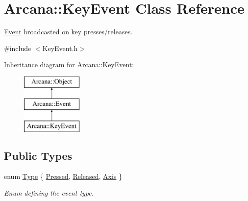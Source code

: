\hypertarget{class_arcana_1_1_key_event}{}\section{Arcana\+:\+:Key\+Event Class Reference}
\label{class_arcana_1_1_key_event}


\mbox{\hyperlink{class_arcana_1_1_event}{Event}} broadcasted on key presses/releases.  




{\ttfamily \#include $<$Key\+Event.\+h$>$}

Inheritance diagram for Arcana\+:\+:Key\+Event\+:\begin{figure}[H]
\begin{center}
\leavevmode
\includegraphics[height=3.000000cm]{class_arcana_1_1_key_event}
\end{center}
\end{figure}
\subsection*{Public Types}
\begin{DoxyCompactItemize}
\item 
enum \mbox{\hyperlink{class_arcana_1_1_key_event_a7e61abd92e372f41647951e8216a93e2}{Type}} \{ \mbox{\hyperlink{class_arcana_1_1_key_event_a7e61abd92e372f41647951e8216a93e2a2b1a00bb9a7e9413f0e672e8c9506153}{Pressed}}, 
\mbox{\hyperlink{class_arcana_1_1_key_event_a7e61abd92e372f41647951e8216a93e2a72cfc2d92b205338e06f3a8493960271}{Released}}, 
\mbox{\hyperlink{class_arcana_1_1_key_event_a7e61abd92e372f41647951e8216a93e2a3285127af15ec2c9ad551b174cd93d77}{Axis}}
 \}
\begin{DoxyCompactList}\small\item\em Enum defining the event type. \end{DoxyCompactList}\end{DoxyCompactItemize}
